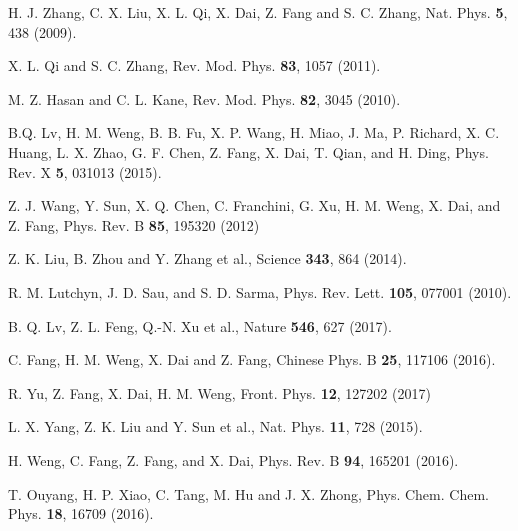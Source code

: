 \documentclass[twocolumn,showkeys,aps,prb,showpacs]{revtex4-1}
\begin{document}
\begin{references}


H. J. Zhang, C. X. Liu, X. L.  Qi, X. Dai, Z. Fang and  S. C.  Zhang, Nat. Phys. \textbf{5}, 438  (2009).

X. L.  Qi and S. C.  Zhang, Rev. Mod. Phys. \textbf{83}, 1057  (2011).

M. Z. Hasan and C. L. Kane, Rev. Mod. Phys. \textbf{82}, 3045  (2010).

B.Q. Lv, H. M. Weng, B. B. Fu, X. P. Wang, H. Miao, J. Ma, P. Richard, X. C. Huang, L. X. Zhao, G. F. Chen, Z. Fang, X. Dai, T. Qian, and H. Ding,
Phys. Rev. X \textbf{5}, 031013  (2015).

Z. J.  Wang, Y. Sun, X. Q.  Chen, C.  Franchini, G.  Xu, H. M. Weng, X.  Dai, and Z.  Fang, Phys. Rev. B \textbf{85}, 195320  (2012)


Z. K. Liu, B. Zhou and  Y. Zhang et al., Science \textbf{343}, 864 (2014).



R.  M. Lutchyn, J. D. Sau, and S. D. Sarma, Phys. Rev. Lett. \textbf{105}, 077001  (2010).

B. Q. Lv,	Z. L. Feng,	Q.-N. Xu et al., Nature \textbf{546}, 627  (2017).



C. Fang, H. M. Weng, X. Dai  and Z. Fang, Chinese Phys. B \textbf{25}, 117106 (2016).


R. Yu, Z. Fang, X. Dai, H. M. Weng, Front. Phys. \textbf{12}, 127202 (2017)



L. X. Yang, Z. K. Liu and Y. Sun et al., Nat. Phys.  \textbf{11}, 728 (2015).



H. Weng, C. Fang, Z. Fang, and X. Dai,  Phys. Rev. B  \textbf{94}, 165201 (2016).


T. Ouyang,  H. P. Xiao, C.  Tang,  M.  Hu and J. X. Zhong, Phys. Chem. Chem. Phys.  \textbf{18}, 16709 (2016).



\end{references}
\end{document}
